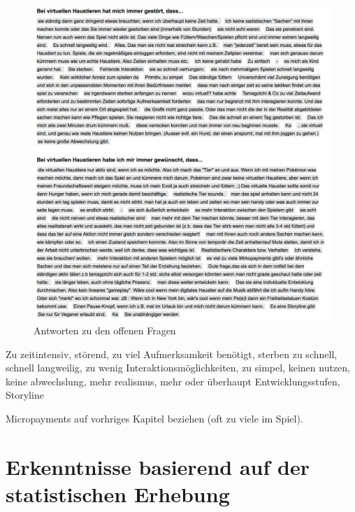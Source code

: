 \begin{figure}[H]
    \centering
    \includegraphics[width=1.01\textwidth]{files/umfrage/einzelErgebnisse}
    \caption{Antworten zu den offenen Fragen}
\end{figure}

Zu zeitintensiv, störend, zu viel Aufmerksamkeit benötigt, sterben zu schnell, schnell langweilig, zu wenig Interaktionsmöglichkeiten, zu simpel, keinen nutzen, keine abwechslung, mehr realismus, mehr oder überhaupt Entwicklungsstufen, Storyline 

Micropayments auf vorhriges Kapitel beziehen (oft zu viele im Spiel).


\section{Erkenntnisse basierend auf der statistischen Erhebung} 


